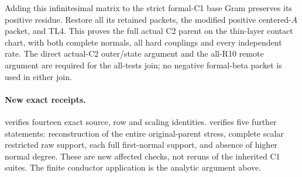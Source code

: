 Adding this infinitesimal matrix to the strict formal-C1 base Gram
preserves its positive residue. Restore all its retained packets,
the modified positive centered-$A$ packet, and TL4. This proves the
full actual C2 parent on the thin-layer contact chart, with both
complete normals, all hard couplings and every independent rate.
The direct actual-C2 outer/state argument and the all-R10 remote
argument are required for the all-tests join; no negative formal-beta
packet is used in either join.

\paragraph{New exact receipts.}
 verifies fourteen exact source, row and scaling
identities.  verifies five further
statements: reconstruction of the entire original-parent stress, complete
scalar restricted raw support, each full first-normal support, and absence
of higher normal degree. These are new affected checks, not reruns of the
inherited C1 suites. The finite conductor application is the analytic
argument above.
